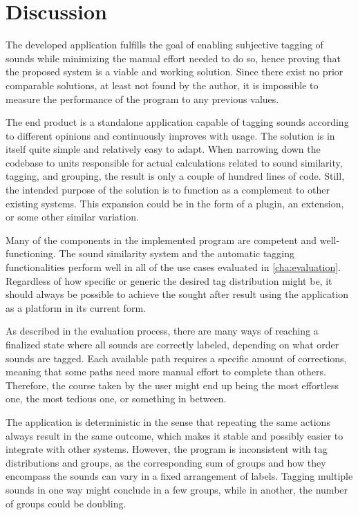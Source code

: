 \bgroup{}

\chapter{Discussion}\label{cha:discussion}
The developed application fulfills the goal of enabling subjective tagging of sounds while minimizing the manual effort needed to do so, hence proving that the proposed system is a viable and working solution. Since there exist no prior comparable solutions, at least not found by the author, it is impossible to measure the performance of the program to any previous values.

The end product is a standalone application capable of tagging sounds according to different opinions and continuously improves with usage. The solution is in itself quite simple and relatively easy to adapt. When narrowing down the codebase to units responsible for actual calculations related to sound similarity, tagging, and grouping, the result is only a couple of hundred lines of code. Still, the intended purpose of the solution is to function as a complement to other existing systems. This expansion could be in the form of a plugin, an extension, or some other similar variation.

Many of the components in the implemented program are competent and well-functioning. The sound similarity system and the automatic tagging functionalities perform well in all of the use cases evaluated in \cref{cha:evaluation}. Regardless of how specific or generic the desired tag distribution might be, it should always be possible to achieve the sought after result using the application as a platform in its current form.

As described in the evaluation process, there are many ways of reaching a finalized state where all sounds are correctly labeled, depending on what order sounds are tagged. Each available path requires a specific amount of corrections, meaning that some paths need more manual effort to complete than others. Therefore, the course taken by the user might end up being the most effortless one, the most tedious one, or something in between.

The application is deterministic in the sense that repeating the same actions always result in the same outcome, which makes it stable and possibly easier to integrate with other systems. However, the program is inconsistent with tag distributions and groups, as the corresponding sum of groups and how they encompass the sounds can vary in a fixed arrangement of labels. Tagging multiple sounds in one way might conclude in a few groups, while in another, the number of groups could be doubling.

